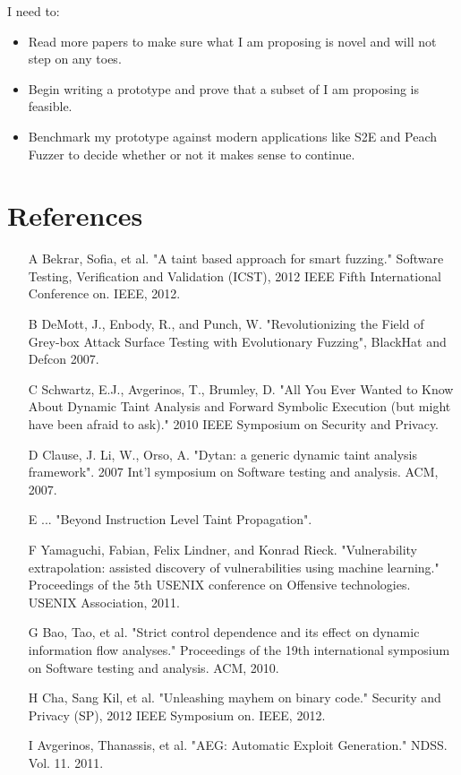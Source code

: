 \documentclass[10pt, twocolumn, times, nocopyrightspace, preprint]{sigplanconf}
\begin{document}
I need to:
\begin{itemize}
	\item Read more papers to make sure what I am proposing is novel and will not step on any toes.
	\item Begin writing a prototype and prove that a subset of I am proposing is feasible.
	\item Benchmark my prototype against modern applications like S2E and Peach Fuzzer to decide whether or not it makes sense to continue.
\end{itemize}
	
\section{References}

\begin{itemize}
	\item [A] Bekrar, Sofia, et al. "A taint based approach for smart fuzzing." Software Testing, Verification and Validation (ICST), 2012 IEEE Fifth International Conference on. IEEE, 2012.
	\item [B] DeMott, J., Enbody, R., and Punch, W. "Revolutionizing the Field of Grey-box Attack Surface Testing with
Evolutionary Fuzzing", BlackHat and Defcon 2007.
	\item [C] Schwartz, E.J., Avgerinos, T., Brumley, D. "All You Ever Wanted to Know About Dynamic Taint Analysis and Forward Symbolic Execution (but might have been afraid to ask)." 2010 IEEE Symposium on Security and Privacy.
	\item [D] Clause, J. Li, W., Orso, A. "Dytan: a generic dynamic taint analysis framework". 2007 Int'l symposium on Software testing and analysis. ACM, 2007.
	\item [E] ... "Beyond Instruction Level Taint Propagation".
	\item [F] Yamaguchi, Fabian, Felix Lindner, and Konrad Rieck. "Vulnerability extrapolation: assisted discovery of vulnerabilities using machine learning." Proceedings of the 5th USENIX conference on Offensive technologies. USENIX Association, 2011.
	\item [G] Bao, Tao, et al. "Strict control dependence and its effect on dynamic information flow analyses." Proceedings of the 19th international symposium on Software testing and analysis. ACM, 2010.
	\item [H] Cha, Sang Kil, et al. "Unleashing mayhem on binary code." Security and Privacy (SP), 2012 IEEE Symposium on. IEEE, 2012.
	\item [I] Avgerinos, Thanassis, et al. "AEG: Automatic Exploit Generation." NDSS. Vol. 11. 2011.

\end{itemize}
\end{document}
